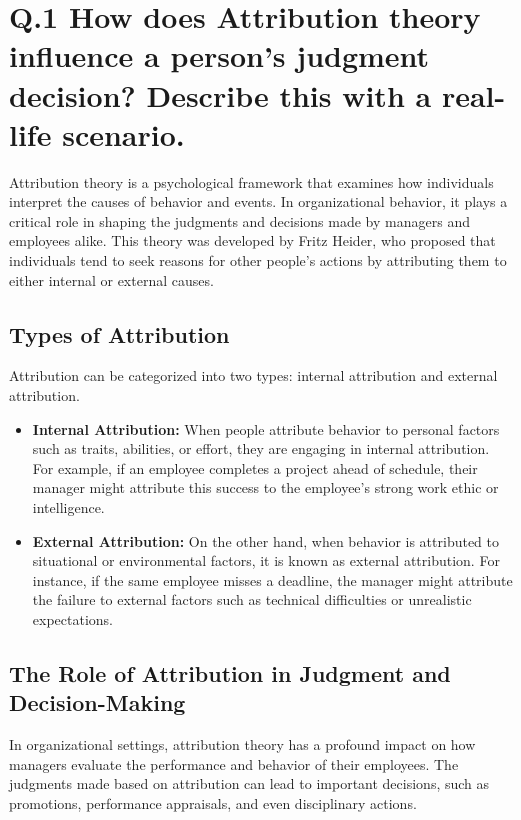 \documentclass{article}
\begin{document}
\begin{titlepage}
    \date{\today}
    \vfill
\end{titlepage}
\section*{Q.1 How does Attribution theory influence a person’s judgment decision? Describe this with a real-life scenario.}

Attribution theory is a psychological framework that examines how individuals interpret the causes of behavior and events. In organizational behavior, it plays a critical role in shaping the judgments and decisions made by managers and employees alike. This theory was developed by Fritz Heider, who proposed that individuals tend to seek reasons for other people's actions by attributing them to either internal or external causes.

\subsection*{Types of Attribution}
Attribution can be categorized into two types: internal attribution and external attribution.

\begin{itemize}
    \item \textbf{Internal Attribution:} When people attribute behavior to personal factors such as traits, abilities, or effort, they are engaging in internal attribution. For example, if an employee completes a project ahead of schedule, their manager might attribute this success to the employee's strong work ethic or intelligence.
    \item \textbf{External Attribution:} On the other hand, when behavior is attributed to situational or environmental factors, it is known as external attribution. For instance, if the same employee misses a deadline, the manager might attribute the failure to external factors such as technical difficulties or unrealistic expectations.
\end{itemize}

\subsection*{The Role of Attribution in Judgment and Decision-Making}
In organizational settings, attribution theory has a profound impact on how managers evaluate the performance and behavior of their employees. The judgments made based on attribution can lead to important decisions, such as promotions, performance appraisals, and even disciplinary actions.
\end{document}
